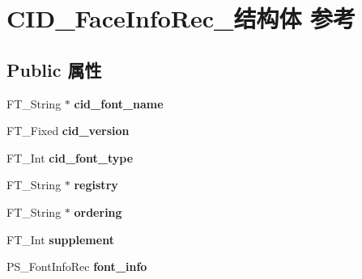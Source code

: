 \hypertarget{struct_c_i_d___face_info_rec__}{}\section{C\+I\+D\+\_\+\+Face\+Info\+Rec\+\_\+结构体 参考}
\label{struct_c_i_d___face_info_rec__}
\subsection*{Public 属性}
\begin{DoxyCompactItemize}
\item 
\mbox{\label{struct_c_i_d___face_info_rec___a804ff6d8a672236f258bfe7baf20867a}} 
F\+T\+\_\+\+String $\ast$ {\bfseries cid\+\_\+font\+\_\+name}
\item 
\mbox{\label{struct_c_i_d___face_info_rec___af37ddd46827a8e45fbcce60f43e2f61c}} 
F\+T\+\_\+\+Fixed {\bfseries cid\+\_\+version}
\item 
\mbox{\label{struct_c_i_d___face_info_rec___a83ce2384925f2fec44a823cf635abe8c}} 
F\+T\+\_\+\+Int {\bfseries cid\+\_\+font\+\_\+type}
\item 
\mbox{\label{struct_c_i_d___face_info_rec___a7f553f371d2c960b4c46876f748f5c0d}} 
F\+T\+\_\+\+String $\ast$ {\bfseries registry}
\item 
\mbox{\label{struct_c_i_d___face_info_rec___acbc231cd616375331c2c1a7bb31b2f87}} 
F\+T\+\_\+\+String $\ast$ {\bfseries ordering}
\item 
\mbox{\label{struct_c_i_d___face_info_rec___a6d35a867d12ca9cfa6ab06cf329d0354}} 
F\+T\+\_\+\+Int {\bfseries supplement}
\item 
\mbox{\label{struct_c_i_d___face_info_rec___ab7a975d269f3d2bd16554d2c3c1ba05f}} 
P\+S\+\_\+\+Font\+Info\+Rec {\bfseries font\+\_\+info}
\item 
\mbox{\label{struct_c_i_d___face_info_rec___a48fe4e9246535f547241028cbf8d8b41}} 

\end{DoxyCompactItemize}
